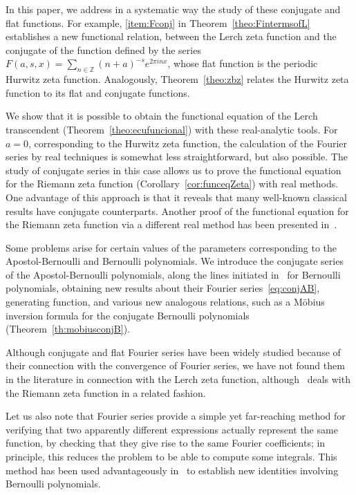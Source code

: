 \documentclass[11pt,a4paper,reqno]{amsart}
\newcommand{\Z}{\mathbb{Z}}
\theoremstyle{plain}
\theoremstyle{remark}
\numberwithin{equation}{section}
\begin{document}
In this paper, we address in a systematic way the study of these conjugate and flat functions. For example, \ref{item:Fconj} in Theorem~\ref{theo:FintermsofL} establishes a new functional relation, between the Lerch zeta function and the conjugate of the function defined by the series $F(a,s,x) = \sum_{n \in \Z} (n+a)^{-s} e^{2 \pi i nx}$, whose flat function is the periodic Hurwitz zeta function. Analogously, Theorem~\ref{theo:zbz} relates the Hurwitz zeta function to its flat and conjugate functions.

We show that it is possible to obtain the functional equation of the Lerch transcendent (Theorem~\ref{theo:ecufuncional}) with these real-analytic tools. For $a=0$, corresponding to the Hurwitz zeta function, the calculation of the Fourier series by real techniques is somewhat less straightforward, but also possible. The study of conjugate series in this case allows us to prove the functional equation for the Riemann zeta function (Corollary~\ref{cor:funceqZeta}) with real methods. One advantage of this approach is that it reveals that many well-known classical results have conjugate counterparts. Another proof of the functional equation for the Riemann zeta function via a different real method has been presented in~\cite[Section~6.2]{Ganzburg}.

Some problems arise for certain values of the parameters corresponding to the Apostol-Bernoulli and Bernoulli polynomials. We introduce the conjugate series of the Apostol-Bernoulli polynomials, along the lines initiated in~\cite{Ha} for Bernoulli polynomials, obtaining new results about their Fourier series~\eqref{eq:conjAB}, generating function, and various new analogous relations, such as a M\"{o}bius
inversion formula for the conjugate Bernoulli polynomials (Theorem~\ref{th:mobiusconjB}).

Although conjugate and flat Fourier series have been widely studied because of their connection with the convergence of Fourier series, we have not found them in the literature in connection with the Lerch zeta function, although~\cite{Ha} deals with the Riemann zeta function in a related fashion.

Let us also note that Fourier series provide a simple yet far-reaching method for verifying that two apparently different expressions actually represent the same function, by checking that they give rise to the same Fourier coefficients; in principle, this reduces the problem to be able to compute some integrals. This method has been used advantageously in~\cite{NRV-IJMMS} to establish new identities involving Bernoulli polynomials.
\end{document}
